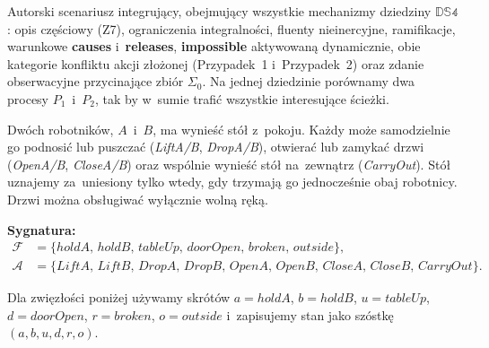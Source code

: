 \documentclass[11pt,a4paper]{article}
\newcommand{\causes}{\textbf{causes}}
\newcommand{\impossible}{\textbf{impossible}}
\newcommand{\releases}{\textbf{releases}}
\theoremstyle{definition}
\begin{document}
\noindent Autorski scenariusz integrujący, obejmujący wszystkie mechanizmy
dziedziny $\mathbb{DS4}$: opis częściowy (Z7), ograniczenia integralności,
fluenty nieinercyjne, ramifikacje, warunkowe \causes{} i~\releases{},
\impossible{} aktywowaną dynamicznie, obie kategorie konfliktu akcji
złożonej (Przypadek~1 i~Przypadek~2) oraz zdanie obserwacyjne przycinające
zbiór $\Sigma_0$. Na jednej dziedzinie porównamy dwa procesy $P_1$~i~$P_2$,
tak by w~sumie trafić wszystkie interesujące ścieżki.

Dwóch robotników, $A$~i~$B$, ma wynieść stół z~pokoju. Każdy może
samodzielnie go podnosić lub puszczać (\textit{LiftA/B}, \textit{DropA/B}),
otwierać lub zamykać drzwi (\textit{OpenA/B}, \textit{CloseA/B}) oraz
wspólnie wynieść stół na~zewnątrz (\textit{CarryOut}). Stół uznajemy
za~uniesiony tylko wtedy, gdy trzymają go jednocześnie obaj robotnicy.
Drzwi można obsługiwać wyłącznie wolną ręką.

\medskip
\noindent\textbf{Sygnatura:}
\begin{align*}
  \mathcal{F} &= \{\mathit{holdA},\, \mathit{holdB},\, \mathit{tableUp},\,
                   \mathit{doorOpen},\, \mathit{broken},\, \mathit{outside}\}, \\
  \mathcal{A} &= \{\mathit{LiftA},\, \mathit{LiftB},\, \mathit{DropA},\, \mathit{DropB},\,
                   \mathit{OpenA},\, \mathit{OpenB},\, \mathit{CloseA},\, \mathit{CloseB},\,
                   \mathit{CarryOut}\}.
\end{align*}

\smallskip\noindent
Dla zwięzłości poniżej używamy skrótów
$a = \mathit{holdA}$, $b = \mathit{holdB}$, $u = \mathit{tableUp}$,
$d = \mathit{doorOpen}$, $r = \mathit{broken}$, $o = \mathit{outside}$
i~zapisujemy stan jako szóstkę $(a,b,u,d,r,o)$.
\end{document}
